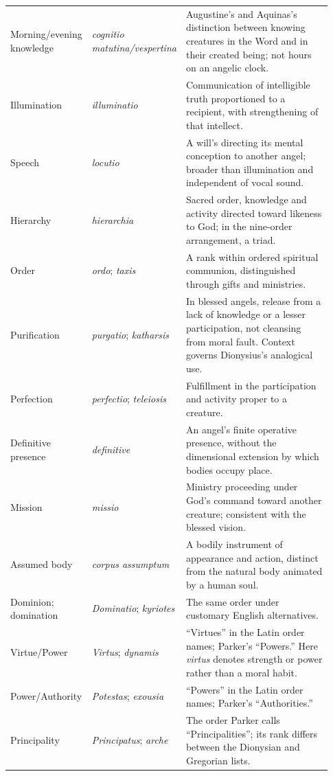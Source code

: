 \begin{longtable}{@{}>{\raggedright\arraybackslash}p{0.19\linewidth}>{\raggedright\arraybackslash}p{0.23\linewidth}>{\raggedright\arraybackslash}p{0.51\linewidth}@{}}
Morning/evening knowledge & \emph{cognitio matutina/vespertina} & Augustine's
and Aquinas's distinction between knowing creatures in the Word and in
their created being; not hours on an angelic clock.\\
Illumination & \emph{illuminatio} & Communication of intelligible truth
proportioned to a recipient, with strengthening of that intellect.\\
Speech & \emph{locutio} & A will's directing its mental conception to
another angel; broader than illumination and independent of vocal sound.\\
Hierarchy & \emph{hierarchia} & Sacred order, knowledge and activity
directed toward likeness to God; in the nine-order arrangement, a triad.\\
Order & \emph{ordo}; \emph{taxis} & A rank within ordered spiritual
communion, distinguished through gifts and ministries.\\
Purification & \emph{purgatio}; \emph{katharsis} & In blessed angels,
release from a lack of knowledge or a lesser participation, not cleansing
from moral fault. Context governs Dionysius's analogical use.\\
Perfection & \emph{perfectio}; \emph{teleiosis} & Fulfillment in the
participation and activity proper to a creature.\\
Definitive presence & \emph{definitive} & An angel's finite operative
presence, without the dimensional extension by which bodies occupy place.\\
Mission & \emph{missio} & Ministry proceeding under God's command toward
another creature; consistent with the blessed vision.\\
Assumed body & \emph{corpus assumptum} & A bodily instrument of appearance
and action, distinct from the natural body animated by a human soul.\\
Dominion; domination & \emph{Dominatio}; \emph{kyriotes} & The same order
under customary English alternatives.\\
Virtue/Power & \emph{Virtus}; \emph{dynamis} & ``Virtues'' in the Latin
order names; Parker's ``Powers.'' Here \emph{virtus} denotes strength or
power rather than a moral habit.\\
Power/Authority & \emph{Potestas}; \emph{exousia} & ``Powers'' in the
Latin order names; Parker's ``Authorities.''\\
Principality & \emph{Principatus}; \emph{arche} & The order Parker calls
``Principalities''; its rank differs between the Dionysian and Gregorian lists.\\
\bottomrule
\end{longtable}


